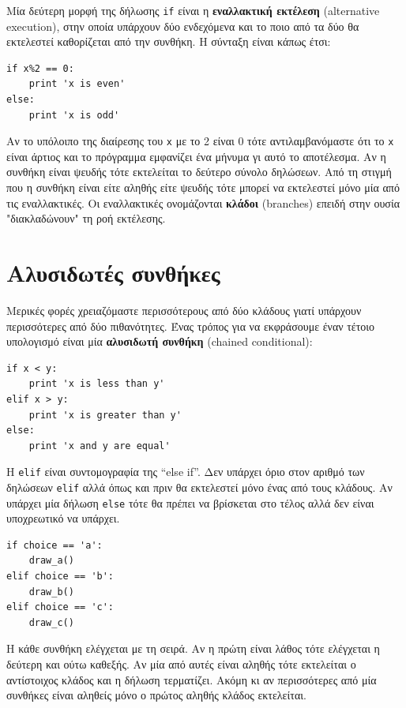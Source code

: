 \documentclass[10pt]{book}
\begin{document}
Μία δεύτερη μορφή της δήλωσης {\tt if} είναι η {\bf εναλλακτική εκτέλεση} (alternative execution), στην οποία υπάρχουν δύο ενδεχόμενα και το ποιο από τα δύο θα εκτελεστεί καθορίζεται από την συνθήκη. Η σύνταξη είναι κάπως έτσι:

\begin{verbatim}
if x%2 == 0:
    print 'x is even'
else:
    print 'x is odd'
\end{verbatim}
%

Αν το υπόλοιπο της διαίρεσης του {\tt x} με το 2 είναι 0 τότε αντιλαμβανόμαστε ότι το {\tt x} είναι άρτιος και το πρόγραμμα εμφανίζει ένα μήνυμα γι αυτό το αποτέλεσμα. Αν η συνθήκη είναι ψευδής τότε εκτελείται το δεύτερο σύνολο δηλώσεων. Από τη στιγμή που η συνθήκη είναι είτε αληθής είτε ψευδής τότε μπορεί να εκτελεστεί μόνο μία από τις εναλλακτικές. Οι εναλλακτικές ονομάζονται {\bf κλάδοι} (branches) επειδή στην ουσία "διακλαδώνουν" τη ροή εκτέλεσης.



\section{Αλυσιδωτές συνθήκες}

Μερικές φορές χρειαζόμαστε περισσότερους από δύο κλάδους γιατί υπάρχουν περισσότερες από δύο πιθανότητες. Ένας τρόπος για να εκφράσουμε έναν τέτοιο υπολογισμό είναι μία {\bf αλυσιδωτή συνθήκη} (chained conditional):

\begin{verbatim}
if x < y:
    print 'x is less than y'
elif x > y:
    print 'x is greater than y'
else:
    print 'x and y are equal'
\end{verbatim}
%

Η {\tt elif} είναι συντομογραφία της ``else if''. Δεν υπάρχει όριο στον αριθμό των δηλώσεων {\tt elif} αλλά όπως και πριν θα εκτελεστεί μόνο ένας από τους κλάδους. Αν υπάρχει μία δήλωση {\tt else} τότε θα πρέπει να βρίσκεται στο τέλος αλλά δεν είναι υποχρεωτικό να υπάρχει.


\begin{verbatim}
if choice == 'a':
    draw_a()
elif choice == 'b':
    draw_b()
elif choice == 'c':
    draw_c()
\end{verbatim}
%

Η κάθε συνθήκη ελέγχεται με τη σειρά. Αν η πρώτη είναι λάθος τότε ελέγχεται η δεύτερη και ούτω καθεξής. Αν μία από αυτές είναι αληθής τότε εκτελείται ο αντίστοιχος κλάδος και η δήλωση τερματίζει. Ακόμη κι αν περισσότερες από μία συνθήκες είναι αληθείς μόνο ο πρώτος αληθής κλάδος εκτελείται.
\end{document}
